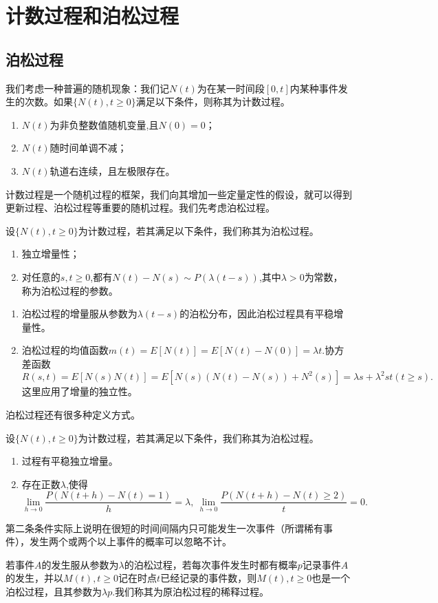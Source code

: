 \documentclass[lang=cn,10pt]{elegantbook}
\begin{document}
	\section{计数过程和泊松过程}
	\subsection{泊松过程}
	我们考虑一种普遍的随机现象：我们记\(N(t)\)为在某一时间段\([0,t]\)内某种事件发生的次数。如果\(\{N(t),t\ge0\}\)满足以下条件，则称其为计数过程。
	\begin{enumerate}
		\item \(N(t)\)为非负整数值随机变量,且\(N(0)=0\)；
		\item \(N(t)\)随时间单调不减；
		\item \(N(t)\)轨道右连续，且左极限存在。
	\end{enumerate}
	计数过程是一个随机过程的框架，我们向其增加一些定量定性的假设，就可以得到更新过程、泊松过程等重要的随机过程。我们先考虑泊松过程。
	\begin{definition}[泊松过程1]
		设\(\{N(t),t\ge0\}\)为计数过程，若其满足以下条件，我们称其为泊松过程。
		\begin{enumerate}
			\item 独立增量性；
			\item 对任意的\(s,t\ge0\),都有\(N(t)-N(s)\sim P(\lambda(t-s))\),其中\(\lambda>0\)为常数，称为泊松过程的参数。
		\end{enumerate}
	\end{definition}
	\begin{note}
		\begin{enumerate}
			\item 泊松过程的增量服从参数为\(\lambda(t-s)\)的泊松分布，因此泊松过程具有平稳增量性。
			\item 泊松过程的均值函数\(m(t)=E[N(t)]=E[N(t)-N(0)]=\lambda t.\)协方差函数\(R(s,t)=E[N(s)N(t)]=E[N(s)(N(t)-N(s))+N^2(s)]=\lambda s+\lambda^2st(t\ge s).\)这里应用了增量的独立性。
		\end{enumerate}
	\end{note}
	泊松过程还有很多种定义方式。
	\begin{definition}[泊松过程2]
		设\(\{N(t),t\ge0\}\)为计数过程，若其满足以下条件，我们称其为泊松过程。
		\begin{enumerate}
			\item 过程有平稳独立增量。
			\item 存在正数\(\lambda\),使得
			\[\lim_{h\to 0}\frac{P(N(t+h)-N(t)=1)}{h}=\lambda,\ \lim_{h\to 0}\frac{P(N(t+h)-N(t)\ge 2)}{t}=0.\]
		\end{enumerate}
	\end{definition}
	\begin{note}
		第二条条件实际上说明在很短的时间间隔内只可能发生一次事件（所谓稀有事件），发生两个或两个以上事件的概率可以忽略不计。
	\end{note}
	若事件\(A\)的发生服从参数为\(\lambda\)的泊松过程，若每次事件发生时都有概率\(p\)记录事件\(A\)的发生，并以\(M(t),t\ge 0\)记在时点\(t\)已经记录的事件数，则\(M(t),t\ge 0\)也是一个泊松过程，且其参数为\(\lambda p\).我们称其为原泊松过程的稀释过程。
\end{document}
